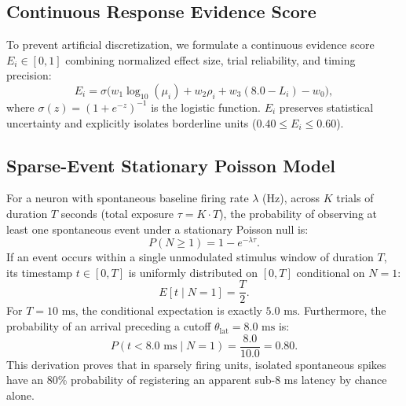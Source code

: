 \documentclass[10pt,journal,compsoc]{IEEEtran}
\begin{document}
\subsection{Continuous Response Evidence Score}
To prevent artificial discretization, we formulate a continuous evidence score $E_i \in [0, 1]$ combining normalized effect size, trial reliability, and timing precision:
\begin{equation}
    E_i = \sigma\Big( w_1 \log_{10}(\mu_i) + w_2 \rho_i + w_3 (8.0 - L_i) - w_0 \Big),
\end{equation}
where $\sigma(z) = (1 + e^{-z})^{-1}$ is the logistic function. $E_i$ preserves statistical uncertainty and explicitly isolates borderline units ($0.40 \le E_i \le 0.60$).

\subsection{Sparse-Event Stationary Poisson Model}
For a neuron with spontaneous baseline firing rate $\lambda$ (Hz), across $K$ trials of duration $T$ seconds (total exposure $\tau = K \cdot T$), the probability of observing at least one spontaneous event under a stationary Poisson null is:
\begin{equation}
    P(N \ge 1) = 1 - e^{-\lambda \tau}.
\end{equation}
If an event occurs within a single unmodulated stimulus window of duration $T$, its timestamp $t \in [0, T]$ is uniformly distributed on $[0, T]$ conditional on $N=1$:
\begin{equation}
    E[t \mid N=1] = \frac{T}{2}.
\end{equation}
For $T = 10\text{ ms}$, the conditional expectation is exactly $5.0\text{ ms}$. Furthermore, the probability of an arrival preceding a cutoff $\theta_{\text{lat}} = 8.0\text{ ms}$ is:
\begin{equation}
    P(t < 8.0\text{ ms} \mid N=1) = \frac{8.0}{10.0} = 0.80.
\end{equation}
This derivation proves that in sparsely firing units, isolated spontaneous spikes have an 80\% probability of registering an apparent sub-8 ms latency by chance alone.
\end{document}
